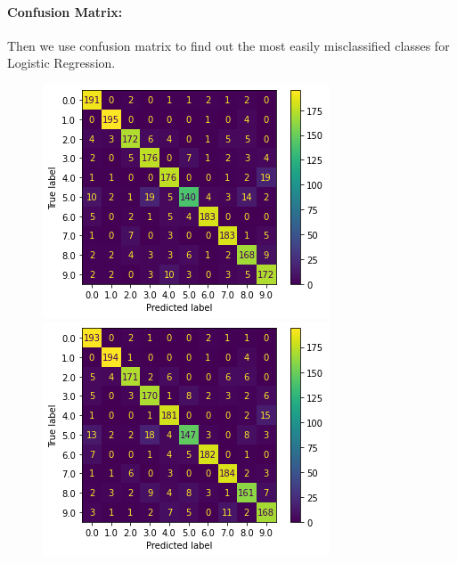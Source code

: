 \documentclass{article}
\begin{document}
\paragraph{Confusion Matrix:}
Then we use confusion matrix to find out the most easily misclassified classes for Logistic Regression.

\begin{figure}[!htb]
  \includegraphics[width=\linewidth]{figure/logit_cm.png}
\endminipage\hfill
{}
  \includegraphics[width=\linewidth]{figure/logit_pca_cm.png}

\end{figure}
\end{document}
